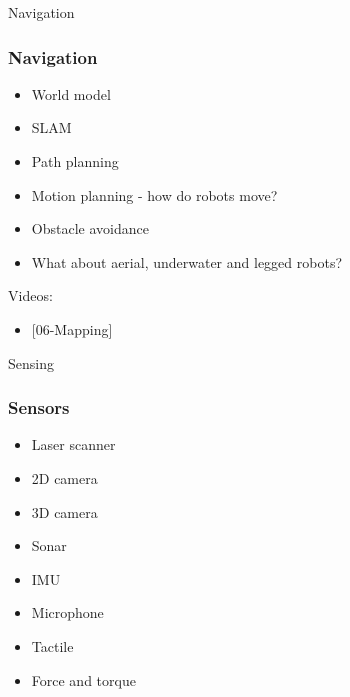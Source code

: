 \documentclass{beamer}
\begin{document}
\begin{frame}[standout]
     Navigation
\end{frame}


\begin{frame}
\frametitle{Navigation}
\begin{itemize}
    \item <1->World model
    \item <2->SLAM
    \item <3->Path planning
    \item <4->Motion planning - how do robots move?
    \item <5->Obstacle avoidance
    \item <6->What about aerial, underwater and legged robots?
\end{itemize}

{\footnotesize
Videos:
\begin{itemize}
\item <2->{[06-Mapping]}
\end{itemize}}
\end{frame}

\begin{frame}[standout]
     Sensing
\end{frame}

\begin{frame}
\frametitle{Sensors}
\begin{itemize}
    \item Laser scanner
    \item 2D camera
    \item 3D camera
    \item Sonar
    \item IMU
    \item Microphone
    \item Tactile
    \item Force and torque
\end{itemize}
\end{frame}
\end{document}
